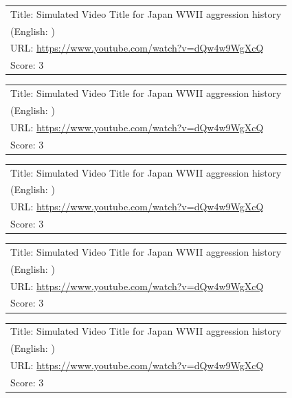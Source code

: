 \documentclass{article}
\begin{document}
\noindent
\begin{tabular}{p{}}
Title: Simulated Video Title for Japan WWII aggression history \\
(English: ) \\
URL: \url{https://www.youtube.com/watch?v=dQw4w9WgXcQ} \\
Score: 3 \\
\end{tabular}
\vspace{0.5em}

\noindent
\begin{tabular}{p{}}
Title: Simulated Video Title for Japan WWII aggression history \\
(English: ) \\
URL: \url{https://www.youtube.com/watch?v=dQw4w9WgXcQ} \\
Score: 3 \\
\end{tabular}
\vspace{0.5em}

\noindent
\begin{tabular}{p{}}
Title: Simulated Video Title for Japan WWII aggression history \\
(English: ) \\
URL: \url{https://www.youtube.com/watch?v=dQw4w9WgXcQ} \\
Score: 3 \\
\end{tabular}
\vspace{0.5em}

\noindent
\begin{tabular}{p{}}
Title: Simulated Video Title for Japan WWII aggression history \\
(English: ) \\
URL: \url{https://www.youtube.com/watch?v=dQw4w9WgXcQ} \\
Score: 3 \\
\end{tabular}
\vspace{0.5em}

\noindent
\begin{tabular}{p{}}
Title: Simulated Video Title for Japan WWII aggression history \\
(English: ) \\
URL: \url{https://www.youtube.com/watch?v=dQw4w9WgXcQ} \\
Score: 3 \\
\end{tabular}
\vspace{0.5em}
\end{document}
